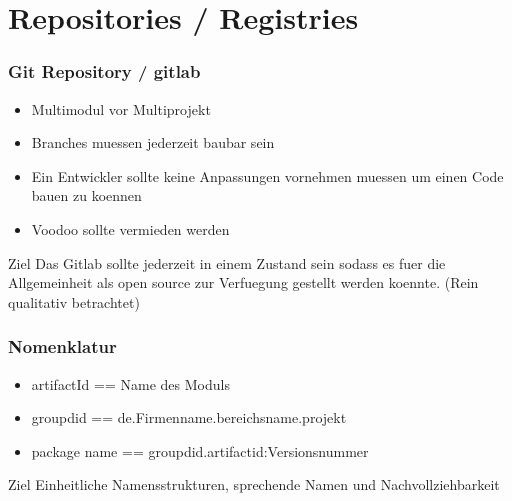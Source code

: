 \section{Repositories / Registries}
\begin{frame}
    \frametitle{Git Repository / gitlab}
    \begin{itemize}
      \item Multimodul vor Multiprojekt
      \item Branches muessen jederzeit baubar sein
      \item Ein Entwickler sollte keine Anpassungen vornehmen muessen um einen Code bauen zu koennen
      \item Voodoo sollte vermieden werden
    \end{itemize}
    \begin{block}{Ziel}
        Das Gitlab sollte jederzeit in einem Zustand sein sodass es fuer die Allgemeinheit als open source zur Verfuegung gestellt werden koennte. (Rein qualitativ betrachtet) 
    \end{block}
\end{frame}
\begin{frame}
    \frametitle{Nomenklatur}
    \begin{itemize}
    \item artifactId == Name des Moduls
    \item groupdid == de.Firmenname.bereichsname.projekt
      \item package name == groupdid.artifactid:Versionsnummer
    \end{itemize}
    \begin{block}{Ziel}
      Einheitliche Namensstrukturen, sprechende Namen und Nachvollziehbarkeit
      \end{block}
\end{frame}